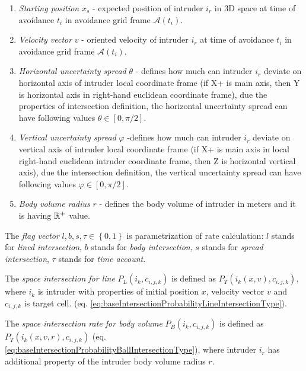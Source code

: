 \begin{enumerate}
    \item\textit{Starting position} ${x}_s$ - expected position of intruder $i_r$ in 3D space at time of avoidance $t_i$ in avoidance grid frame $\mathscr{A}(t_i)$.
    
    \item\textit{Velocity vector} ${v}$ - oriented velocity of intruder $i_r$ at time of avoidance $t_i$ in avoidance grid frame $\mathscr{A}(t_i)$. 
    
    \item\textit{Horizontal uncertainty spread} $\theta$ - defines how much can intruder $i_r$ deviate on horizontal axis of intruder local coordinate frame (if X+ is main axis, then Y is horizontal axis in right-hand euclidean coordinate frame), due the properties of intersection definition, the horizontal uncertainty spread can have following values $\theta\in[0,\pi/2]$.
    
    \item\textit{Vertical uncertainty spread} $\varphi$ -defines how much can intruder $i_r$ deviate on vertical axis of intruder local coordinate frame (if X+ is main axis in local right-hand euclidean intruder coordinate frame, then Z is horizontal vertical axis), due the intersection definition, the vertical uncertainty spread can have following values $\varphi\in[0,\pi/2]$.
    
    \item\textit{Body volume radius} $r$ - defines the body volume of intruder in meters and it is having  $\mathbb{R}^+$  value.
\end{enumerate}

\noindent The \emph{flag vector} $l,b,s,\tau \in \left\{0,1\right\}$ is parametrization of rate calculation: $l$ stands for \emph{lined intersection}, $b$ stands for \emph{body intersection}, $s$ stands for \emph{spread intersection}, $\tau$ stands for \emph{time account}. 

The \emph{space intersection for line} $P_L(i_k,c_{i,j,k})$ is defined as $P_T(i_k({x},{v}),c_{i,j,k})$, where $i_k$ is intruder with properties of initial position ${x}$, velocity vector ${v}$ and $c_{i,j,k}$ is target cell. (eq. \ref{eq:baseIntersectionProbabilityLineIntersectionType}). 

The \emph{space intersection rate for body volume} $P_B(i_k,c_{i,j,k})$ is defined as $P_T(i_k({x},{v},r),c_{i,j,k})$ (eq. \ref{eq:baseIntersectionProbabilityBallIntersectionType}), where intruder $i_r$ has additional property of the intruder body volume radius $r$. 

